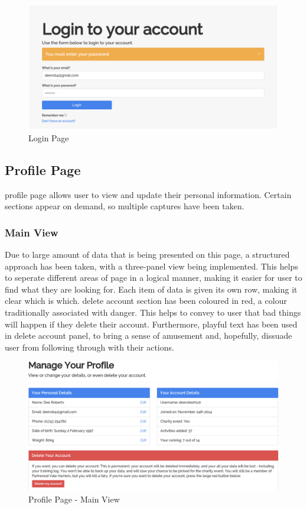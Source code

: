 \documentclass{article}[12pt,a4paper]
\begin{document}
\begin{figure}[h!]
  \includegraphics[scale=0.35]{final_ui/login}
  \caption{Login Page}
\end{figure}
\clearpage

\subsection{Profile Page}
profile page allows user to view and update their personal information. Certain sections appear on demand, so multiple captures have been taken.

\subsubsection{Main View}
Due to large amount of data that is being presented on this page, a structured approach has been taken, with a three-panel view being implemented. This helps to seperate different areas of page in a logical manner, making it easier for user to find what they are looking for. Each item of data is given its own row, making it clear which is which. delete account section has been coloured in red, a colour traditionally associated with danger. This helps to convey to user that bad things will happen if they delete their account. Furthermore, playful text has been used in delete account panel, to bring a sense of amusement and, hopefully, dissuade user from following through with their actions.

\begin{figure}[h!]
  \includegraphics[scale=0.35]{final_ui/profile}
  \caption{Profile Page - Main View}
\end{figure}
\clearpage
\end{document}
